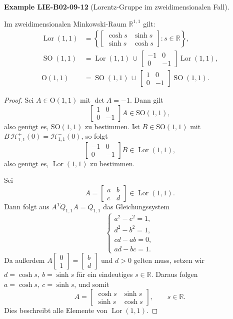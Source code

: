 \documentclass[10pt, letterpaper]{article}
\newcommand{\CustomHeading}[3]{%
  \par\medskip\noindent%
  \textbf{#1 #2} \textnormal{(#3)}.\enskip%
}
\newenvironment{EXA}[2]{\begin{unitbox}\CustomHeading{Example}{#1}{#2}}{\end{unitbox}}
\begin{document}
\begin{EXA}{LIE-B02-09-12}{Lorentz-Gruppe im zweidimensionalen Fall}
Im zweidimensionalen Minkowski-Raum \(\mathbb{R}^{1,1}\) gilt:
\[
\begin{aligned}
\operatorname{Lor}(1,1)
&=\left\{
\begin{bmatrix}
\cosh s & \sinh s\\
\sinh s & \cosh s
\end{bmatrix}
: s\in\mathbb{R}
\right\},\\[1em]
\operatorname{SO}(1,1)
&=\operatorname{Lor}(1,1)\,
\cup\,
\begin{bmatrix}
-1 & 0\\
0 & -1
\end{bmatrix}
\operatorname{Lor}(1,1),\\[1em]
\mathrm{O}(1,1)
&=\operatorname{SO}(1,1)\,
\cup\,
\begin{bmatrix}
1 & 0\\
0 & -1
\end{bmatrix}
\operatorname{SO}(1,1).
\end{aligned}
\]

\begin{proof}
Sei \(A\in \mathrm{O}(1,1)\) mit \(\det A=-1\). Dann gilt
\[
\begin{bmatrix}
1 & 0\\
0 & -1
\end{bmatrix}A\in\mathrm{SO}(1,1),
\]
also genügt es, \(\mathrm{SO}(1,1)\) zu bestimmen.
Ist \(B\in\mathrm{SO}(1,1)\) mit
\(B\,\mathcal H_{1,1}^{+}(0)=\mathcal H_{1,1}^{-}(0)\),
so folgt
\[
\begin{bmatrix}
-1 & 0\\
0 & -1
\end{bmatrix}B\in \operatorname{Lor}(1,1),
\]
also genügt es, \(\operatorname{Lor}(1,1)\) zu bestimmen.

Sei
\[
A=
\begin{bmatrix}
a & b\\
c & d
\end{bmatrix}
\in \operatorname{Lor}(1,1).
\]
Dann folgt aus \(A^{T}Q_{1,1}A=Q_{1,1}\) das Gleichungssystem
\[
\begin{cases}
a^{2}-c^{2}=1,\\
d^{2}-b^{2}=1,\\
cd-ab=0,\\
ad-bc=1.
\end{cases}
\]
Da außerdem
\(
A
\begin{bmatrix}
0\\1
\end{bmatrix}
=
\begin{bmatrix}
b\\d
\end{bmatrix}
\)
und \(d>0\) gelten muss, setzen wir \(d=\cosh s,\ b=\sinh s\)
für ein eindeutiges \(s\in\mathbb{R}\). Daraus folgen \(a=\cosh s,\ c=\sinh s\),
und somit
\[
A=
\begin{bmatrix}
\cosh s & \sinh s\\
\sinh s & \cosh s
\end{bmatrix},\qquad s\in\mathbb{R}.
\]
Dies beschreibt alle Elemente von \(\operatorname{Lor}(1,1)\).
\end{proof}
\end{EXA}
\end{document}
